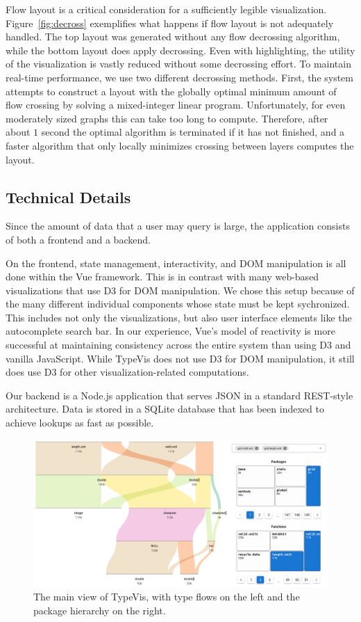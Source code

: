 \documentclass{vgtc}                          %
\begin{document}
Flow layout is a critical consideration
for a sufficiently legible visualization.
Figure~\ref{fig:decross} exemplifies what
happens if flow layout is not adequately handled.
The top layout was generated without any
flow decrossing algorithm,
while the bottom layout does
apply decrossing.
Even with highlighting,
the utility of the visualization is vastly
reduced without some decrossing effort.
To maintain real-time performance,
we use two different decrossing methods.
First, the system attempts to construct
a layout with the globally optimal
minimum amount of flow crossing by
solving a mixed-integer linear program.
Unfortunately, for even moderately
sized graphs this can take too long to compute.
Therefore, after about $1$ second
the optimal algorithm is terminated
if it has not finished, and a faster
algorithm that only locally minimizes crossing
between layers computes the layout.

\subsection{Technical Details}

Since the amount of data that a user may query is large,
the application consists of both a frontend and a backend.

On the frontend, state management, interactivity,
and DOM manipulation is all done within the Vue framework.
This is in contrast with many web-based visualizations
that use D3 for DOM manipulation.
We chose this setup because of the many different
individual components whose state must be kept
sychronized.
This includes not only the visualizations, but also
user interface elements like the autocomplete search bar.
In our experience, Vue's model of reactivity is
more successful at maintaining consistency across the
entire system than using D3 and vanilla JavaScript.
While {\sc TypeVis} does not use D3 for DOM manipulation,
it still does use D3 for other visualization-related
computations.

Our backend is a Node.js application that serves
JSON in a standard REST-style architecture.
Data is stored in a SQLite database that has been
indexed to achieve lookups as fast as possible.

\begin{figure}
 \centering
 \includegraphics[width=\linewidth]{img/typevis.png}
 \caption{The main view of {\sc TypeVis}, with type flows on the left and the package hierarchy on the right.}
 \label{fig:typevis}
\end{figure}
\end{document}
